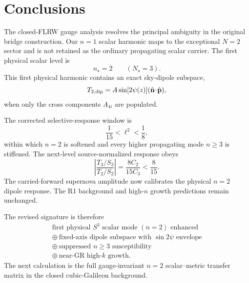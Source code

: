 \section{Conclusions}

The closed-FLRW gauge analysis resolves the principal ambiguity in the original bridge construction. Our \(n=1\) scalar harmonic maps to the exceptional \(N=2\) sector and is not retained as the ordinary propagating scalar carrier. The first physical scalar level is
\[
\boxed{n_\star=2}\qquad(\boxed{N_\star=3}).
\]
This first physical harmonic contains an exact sky-dipole subspace,
\[
T_{2,\rm dip}=A\sin[2\psi(z)](\hat{\mathbf n}\!\cdot\!\hat{\mathbf p}),
\]
when only the cross components \(A_{4i}\) are populated.

The corrected selective-response window is
\[
\boxed{\frac1{15}<\ell^2<\frac18},
\]
within which \(n=2\) is softened and every higher propagating mode \(n\ge3\) is stiffened. The next-level source-normalized response obeys
\[
\left|\frac{T_3/S_3}{T_2/S_2}\right|=\frac{8C_2}{15C_3}<\frac8{15}.
\]
The carried-forward supernova amplitude now calibrates the physical \(n=2\) dipole response. The R1 background and high-\(n\) growth predictions remain unchanged.

The revised signature is therefore
\[
\boxed{
\begin{gathered}
\text{first physical }S^3\text{ scalar mode }(n=2)\text{ enhanced}\\
\oplus\ \text{fixed-axis dipole subspace with }\sin2\psi\text{ envelope}\\
\oplus\ \text{suppressed }n\ge3\text{ susceptibility}\\
\oplus\ \text{near-GR high-}k\text{ growth}.
\end{gathered}}
\]
The next calculation is the full gauge-invariant \(n=2\) scalar--metric transfer matrix in the closed cubic-Galileon background.

